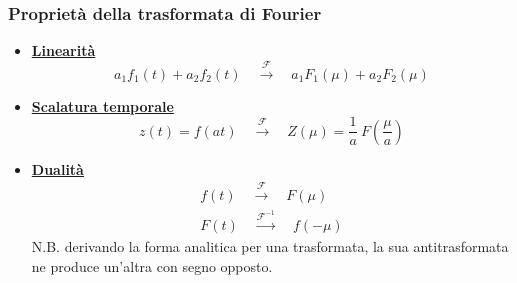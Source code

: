 \documentclass[a4paper]{article}
\begin{document}
	\newpage
	
	\subsubsection{Proprietà della trasformata di Fourier}
	
	\begin{itemize}[label=]
		\item \textcolor{Red3}{\textbf{\underline{Linearità}}}
			\begin{equation*}
				a_{1} f_{1}\left(t\right) + a_{2}f_{2}\left(t\right) \hspace{1em} \xrightarrow{\mathcal{F}} \hspace{1em} a_{1}F_{1}\left(\mu\right) + a_{2}F_{2}\left(\mu\right)
			\end{equation*}
		
		\item \textcolor{Red3}{\textbf{\underline{Scalatura temporale}}}
			\begin{equation*}
				z\left(t\right) = f\left(at\right) \hspace{1em} \xrightarrow{\mathcal{F}} \hspace{1em} Z\left(\mu\right) = \dfrac{1}{a} \: F\left(\dfrac{\mu}{a}\right)
			\end{equation*}
		
		\item \textcolor{Red3}{\textbf{\underline{Dualità}}}
			\begin{gather*}
				f\left(t\right) \hspace{1em} \xrightarrow{\mathcal{F}} \hspace{1em} F\left(\mu\right) \\
				F\left(t\right) \hspace{1em} \xrightarrow{\mathcal{F^{-1}}} \hspace{1em} f\left(-\mu\right)
			\end{gather*}
			N.B. derivando la forma analitica per una trasformata, la sua antitrasformata ne produce un'altra con segno opposto.
			

\end{itemize}
\end{document}
